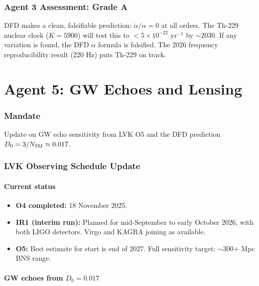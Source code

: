\documentclass[11pt,a4paper]{article}
\begin{document}
\section{Agent 3 Assessment: Grade A}

DFD makes a clean, falsifiable prediction: $\dot{\alpha}/\alpha = 0$ at all orders. The Th-229 nuclear clock ($K = 5900$) will test this to $< 5 \times 10^{-22}$ yr$^{-1}$ by $\sim$2030. If any variation is found, the DFD $\alpha$ formula is falsified. The 2026 frequency reproducibility result (220 Hz) puts Th-229 on track.


\part{Agent 5: GW Echoes and Lensing}
\label{part:agent5}

\section{Mandate}
Update on GW echo sensitivity from LVK O5 and the DFD prediction $D_0 = 3/N_{\rm SM} \approx 0.017$.

\section{LVK Observing Schedule Update}

\subsection{Current status}

\begin{itemize}
\item \textbf{O4 completed:} 18 November 2025.
\item \textbf{IR1 (interim run):} Planned for mid-September to early October 2026, with both LIGO detectors. Virgo and KAGRA joining as available.
\item \textbf{O5:} Best estimate for start is end of 2027. Full sensitivity target: $\sim$300+ Mpc BNS range.
\end{itemize}

\subsection{GW echoes from $D_0 = 0.017$}
\end{document}
